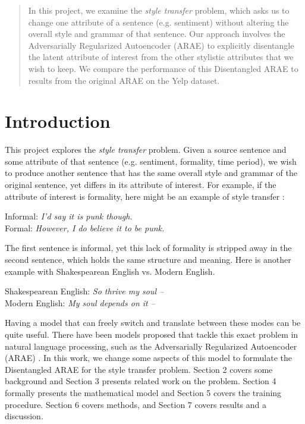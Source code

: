\documentclass{article}
\begin{document}

\begin{abstract}
In this project, we examine the \emph{style transfer} problem, which asks us to change one attribute of a sentence (e.g. sentiment) without altering the overall style and grammar of that sentence.  Our approach involves the Adversarially Regularized Autoencoder (ARAE) \cite{arae} to explicitly disentangle the latent attribute of interest from the other stylistic attributes that we wish to keep.  We compare the performance of this Disentangled ARAE to results from the original ARAE on the Yelp dataset.
\end{abstract}

\section{Introduction}
\label{sec:introduction}

This project explores the \emph{style transfer} problem.  Given a source sentence and some attribute of that sentence (e.g. sentiment, formality, time period), we wish to produce another sentence that has the same overall style and grammar of the original sentence, yet differs in its attribute of interest.  For example, if the attribute of interest is formality, here might be an example of style transfer \cite{rao}:

\begin{center}
Informal: \emph{I'd say it is punk though.} \\
Formal: \emph{However, I do believe it to be punk.}
\end{center}

The first sentence is informal, yet this lack of formality is stripped away in the second sentence, which holds the same structure and meaning.  Here is another example with Shakespearean English vs. Modern English.

\begin{center}
Shakespearean English: \emph{So thrive my soul --} \\
Modern English: \emph{My soul depends on it --}
\end{center} 

Having a model that can freely switch and translate between these modes can be quite useful.  There have been models proposed that tackle this exact problem in natural language processing, such as the Adversarially Regularized Autoencoder (ARAE) \cite{arae}.  In this work, we change some aspects of this model to formulate the Disentangled ARAE for the style transfer problem.  Section 2 covers some background and Section 3 presents related work on the problem.  Section 4 formally presents the mathematical model and Section 5 covers the training procedure.  Section 6 covers methods, and Section 7 covers results and a discussion.  
\end{document}

